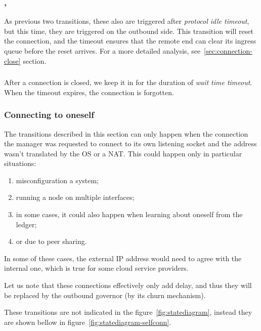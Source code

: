 \subsubsection{\CommitUniLoc{}, \CommitDupLoc{}}\label{sec:tr_commit_loc}
As previous two transitions, these also are triggered after \textit{protocol idle
timeout}, but this time, they are triggered on the outbound side.  This transition
will reset the connection, and the timeout ensures that the remote end can clear its ingress queue before the \TCP{} reset arrives.  For a more
detailed analysis, see~\ref{sec:connection-close} section.


\subsubsection{\Terminate{}}
After a connection is closed, we keep it in \TerminatingState{} for the
duration of \textit{wait time timeout}.  When the timeout expires, the
connection is forgotten.  

\subsubsection{Connecting to oneself}
The transitions described in this section can only happen when the connection
the manager was requested to connect to its own listening socket and the address
wasn't translated by the \textsf{OS} or a \textsf{NAT}.  This could happen only
in particular situations:

\begin{enumerate}
  \item misconfiguration a system;
  \item running a node on multiple interfaces;
  \item in some cases, it could also happen when learning about oneself from the
    ledger;
  \item or due to peer sharing.
\end{enumerate}

In some of these cases, the external IP address would need to agree with the
internal one, which is true for some cloud service providers.

Let us note that these connections effectively only add delay, and thus they
will be replaced by the outbound governor (by its churn mechanism).

These transitions are not indicated in the figure~\ref{fig:statediagram},
instead they are shown bellow in figure~\ref{fig:statediagram-selfconn}.

